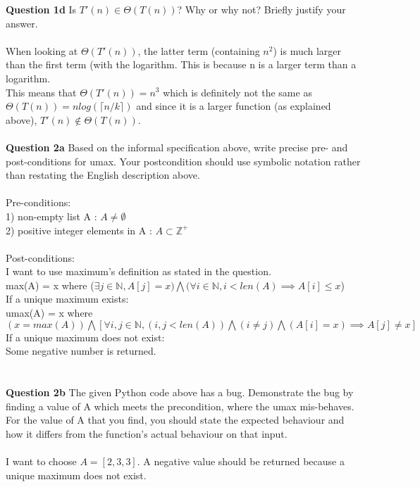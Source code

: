 \documentclass[12pt]{article}
\begin{document}
\noindent\textbf{Question 1d} Is $T'(n) \in \Theta(T(n))$? Why or why not? Briefly justify your answer.
\\
\\
When looking at $\Theta(T'(n))$, the latter term (containing $n^2$) is much larger than the first term (with the logarithm. This is because n is a larger term than a logarithm.\\
This means that $\Theta(T'(n)) = n^3$ which is definitely not the same as $\Theta(T(n)) = nlog(\lceil n/k \rceil)$ and since it is a larger function (as explained above), $T'(n) \not \in \Theta(T(n))$.
\\
\\
\noindent\textbf{Question 2a} Based on the informal specification above, write precise pre- and post-conditions for umax. Your postcondition should use symbolic notation rather than restating the English description above.
\\
\\
Pre-conditions:\\
1) non-empty list A : $A \not = \emptyset$\\
2) positive integer elements in A : $A \subset \mathbb{Z}^+$\\
\\
Post-conditions:\\
I want to use maximum's definition as stated in the question.\\
max(A) = x where ($\exists j \in \mathbb{N}, A[j] = x) \bigwedge (\forall i \in \mathbb{N}, i < len(A) \implies A[i] \leq x$)\\
If a unique maximum exists: \\
umax(A) = x where $(x = max(A))\bigwedge [\forall i,j \in \mathbb{N}, (i,j < len(A)) \bigwedge (i \not = j) \bigwedge (A[i] = x) \implies A[j] \not = x]$\\
If a unique maximum does not exist:\\
Some negative number is returned.\\
\\
\\
\noindent\textbf{Question 2b} The given Python code above has a bug. Demonstrate the bug by finding a value of A which meets the precondition, where the umax mis-behaves. For the value of A that you find,  you should state the expected behaviour and how it differs from the function's actual behaviour on that input.
\\
\\
I want to choose $A = [2,3,3]$. A negative value should be returned because a unique maximum does not exist.\\
\end{document}
